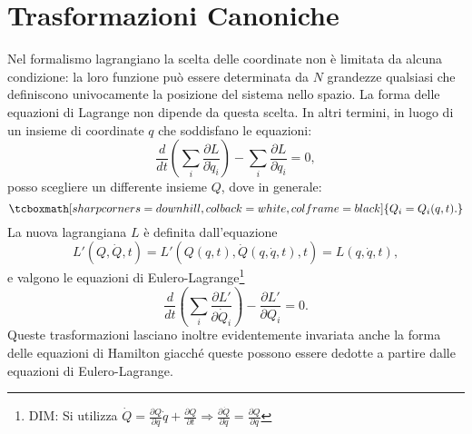 \section[Trasformazioni Canoniche]{Trasformazioni Canoniche}
Nel formalismo lagrangiano la scelta delle coordinate non \`e limitata da alcuna condizione: la loro funzione pu\`o essere determinata da $N$ grandezze qualsiasi che definiscono univocamente la posizione del sistema nello spazio. La forma delle equazioni di Lagrange non dipende da questa scelta. In altri termini, in luogo di un insieme di coordinate $q$ che soddisfano le equazioni:
	\begin{equation}
		\frac{d}{dt}  \left( \sum_i\frac{\partial L}{\partial \dot{q}_i} \right) - \sum_i \frac{\partial L}{\partial q_i} = 0 ,
	\end{equation}
posso scegliere un differente insieme $Q$, dove in generale:
	\begin{equation}
		\tcboxmath[sharp corners=downhill, colback=white, colframe=black]{
			Q_i = Q_i(q,t) .
			}
		\label{eq:cap6_1}
	\end{equation}
La nuova lagrangiana $L$ \`e definita dall'equazione
	\begin{equation}
		L'(Q,\dot{Q},t) = L'\left(Q(q,t), \dot {Q}(q, \dot{q}, t), t \right) = L(q,\dot{q},t) ,
	\end{equation}
e valgono le equazioni di Eulero-Lagrange\footnote{DIM: Si utilizza $\dot{Q} = \frac{\partial Q}{\partial q}\dot{q} + \frac{\partial Q}{\partial t} \Rightarrow \frac{\partial \dot{Q}}{\partial \dot{q}} = \frac{\partial Q}{\partial q}$ }
	\begin{equation}
		\frac{d}{dt} \left( \sum_i \frac{\partial L'}{\partial \dot{Q}_i} \right) - \frac{\partial L'}{\partial Q_i} = 0 .
	\end{equation}
Queste trasformazioni lasciano inoltre evidentemente invariata anche la forma delle equazioni di Hamilton giacch\'e queste possono essere dedotte a partire dalle equazioni di Eulero-Lagrange.\\


